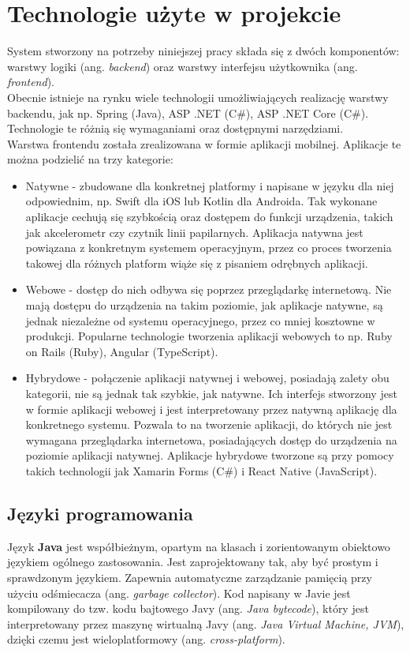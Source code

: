\chapter{Technologie użyte w projekcie}
System stworzony na potrzeby niniejszej pracy składa się z dwóch komponentów: warstwy logiki (ang. \textit{backend}) oraz warstwy interfejsu użytkownika (ang. \textit{frontend}).\\
Obecnie istnieje na rynku wiele technologii umożliwiających realizację warstwy backendu, jak np. Spring (Java), ASP .NET (C\#), ASP .NET Core (C\#). Technologie te różnią się wymaganiami oraz dostępnymi narzędziami.\\
Warstwa frontendu została zrealizowana w formie aplikacji mobilnej. Aplikacje te można podzielić na trzy kategorie:
\begin{itemize}
	\item Natywne - zbudowane dla konkretnej platformy i napisane w języku dla niej odpowiednim, np. Swift dla iOS lub Kotlin dla Androida. Tak wykonane aplikacje cechują się szybkością oraz dostępem do funkcji urządzenia, takich jak akcelerometr czy czytnik linii papilarnych. Aplikacja natywna jest powiązana z konkretnym systemem operacyjnym, przez co proces tworzenia takowej dla różnych platform wiąże się z pisaniem odrębnych aplikacji.
	\item  Webowe - dostęp do nich odbywa się poprzez przeglądarkę internetową. Nie mają dostępu do urządzenia na takim poziomie, jak aplikacje natywne, są jednak niezależne od systemu operacyjnego, przez co mniej kosztowne w produkcji. Popularne technologie tworzenia aplikacji webowych to np. Ruby on Rails (Ruby), Angular (TypeScript).
	\item Hybrydowe - połączenie aplikacji natywnej i webowej, posiadają zalety obu kategorii, nie są jednak tak szybkie, jak natywne. Ich interfejs stworzony jest w formie aplikacji webowej i jest interpretowany przez natywną aplikację dla konkretnego systemu. Pozwala to na tworzenie aplikacji, do których nie jest wymagana przeglądarka internetowa, posiadających dostęp do urządzenia na poziomie aplikacji natywnej. Aplikacje hybrydowe tworzone są przy pomocy takich technologii jak Xamarin Forms (C\#) i React Native (JavaScript).
\end{itemize}
\section{Języki programowania}
Język \textbf{Java} jest współbieżnym, opartym na klasach i zorientowanym obiektowo językiem ogólnego zastosowania. Jest zaprojektowany tak, aby być prostym i sprawdzonym językiem. Zapewnia automatyczne zarządzanie pamięcią przy użyciu odśmiecacza (ang. \textit{garbage collector}). Kod napisany w Javie jest kompilowany do tzw. kodu bajtowego Javy (ang. \textit{Java bytecode}), który jest interpretowany przez maszynę wirtualną Javy (ang. \textit{Java Virtual Machine, JVM}), dzięki czemu jest wieloplatformowy (ang. \textit{cross-platform}).\cite{jamesgoslingbilljoyguysteelegiladbrachaalexbuckley2015}


